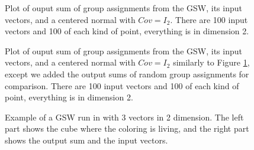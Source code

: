 \documentclass[12pt]{article}
\begin{document}
\begin{figure}[h]

\caption{Plot of ouput sum of group assignments from the GSW, its input vectors, and a centered normal with $Cov=I_2$. There are 100 input vectors and 100 of each kind of point, everything is in dimension 2.}
\label{4types_3}
\end{figure}
\begin{figure}[h]

\caption{Plot of ouput sum of group assignments from the GSW, its input vectors, and a centered normal with $Cov=I_2$ similarly to Figure \ref{4types_3}, except we added the output sums of random group assignments for comparison. There are 100 input vectors and 100 of each kind of point, everything is in dimension 2.}
\end{figure}
\begin{figure}
\begin{center}
\newpage
{}
\caption{Example of a GSW run in with 3 vectors in 2 dimension. The left part shows the cube where the coloring is living, and the right part shows the output sum and the input vectors.}
\label{3d_example}
\end{center}
\end{figure}
\end{document}
